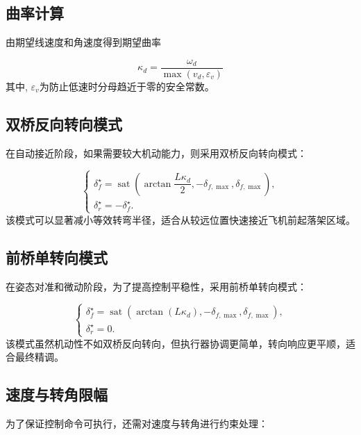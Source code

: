 \subsection{曲率计算}

由期望线速度和角速度得到期望曲率

\begin{equation}
\kappa_{d} = \frac{\omega_{d}}{\max(v_{d},\varepsilon_{v})}
\label{eq:31}
\end{equation}
其中, \(\varepsilon_{v}\)为防止低速时分母趋近于零的安全常数。

\subsection{双桥反向转向模式}

在自动接近阶段，如果需要较大机动能力，则采用双桥反向转向模式\cite{ref19,ref28}：

\begin{equation}
\begin{cases}
\delta_f^{\star}=\operatorname{sat}\left(\arctan\dfrac{L\kappa_d}{2},-\delta_{f,\max},\delta_{f,\max}\right),\\
\delta_r^{\star}=-\delta_f^{\star}.
\end{cases}
\label{eq:opposite_mapping}
\end{equation}
该模式可以显著减小等效转弯半径，适合从较远位置快速接近飞机前起落架区域。

\subsection{前桥单转向模式}

在姿态对准和微动阶段，为了提高控制平稳性，采用前桥单转向模式：

\begin{equation}
\begin{cases}
\delta_f^{\star}=\operatorname{sat}\left(\arctan(L\kappa_d),-\delta_{f,\max},\delta_{f,\max}\right),\\
\delta_r^{\star}=0.
\end{cases}
\label{eq:front_mapping}
\end{equation}
该模式虽然机动性不如双桥反向转向，但执行器协调更简单，转向响应更平顺，适合最终精调。

\subsection{速度与转角限幅}

为了保证控制命令可执行，还需对速度与转角进行约束处理：


